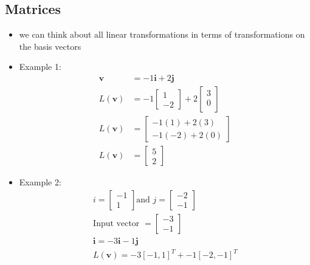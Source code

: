 \subsection{Matrices}
\begin{itemize}
    \item we can think about all linear transformations in terms of transformations on the basis vectors
    \item Example 1:
    \begin{align}
        \mathbf{v} &= -1\mathbf{i} + 2\mathbf{j} \\
        L(\mathbf{v}) &= -1 \begin{bmatrix}
             1 \\
            -2 
            \end{bmatrix} + 2 \begin{bmatrix}
            3 \\
            0 \\
            \end{bmatrix} \\
        L(\mathbf{v}) &= \begin{bmatrix}
            -1(1) + 2(3) \\
            -1(-2) + 2(0)
        \end{bmatrix} \\
        L(\mathbf{v}) &= \begin{bmatrix}
        5 \\
        2 
        \end{bmatrix}
    \end{align}
    \item Example 2:
    \begin{align}
        i = \begin{bmatrix}
        -1 \\
        1
        \end{bmatrix} \text{and } j = \begin{bmatrix}
        -2 \\ 
        -1
        \end{bmatrix} \\
        \text{Input vector } = \begin{bmatrix}
        -3 \\ 
        -1
        \end{bmatrix} \\
        \mathbf{i} = -3\mathbf{i} - 1\mathbf{j} \\
        L(\mathbf{v}) = -3 [-1, 1]^T + -1 [-2, -1]^T \\

\end{align}
\end{itemize}
